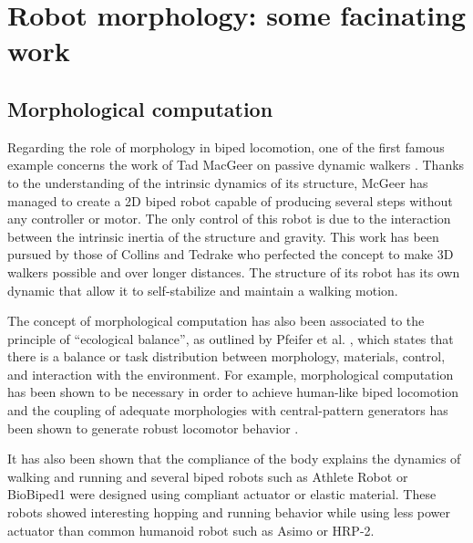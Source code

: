 

\chapter{Robot morphology: some facinating work} %

\section{Morphological computation} %

Regarding the role of morphology in biped locomotion, one of the first famous example concerns the work of Tad MacGeer on passive dynamic walkers \cite{mcgeer1990passive}. Thanks to the understanding of the intrinsic dynamics of its structure, McGeer has managed to create a 2D biped robot capable of producing several steps without any controller or motor. The only control of this robot is due to the interaction between the intrinsic inertia of the structure and gravity. This work has been pursued by those of Collins \cite{collins2001three} and Tedrake \cite{Tedrake2004}  who perfected the concept to make 3D walkers possible and over longer distances. The structure of its robot has its own dynamic that allow it to self-stabilize and maintain a walking motion.

The concept of morphological computation has also been associated to the principle of “ecological balance”, as outlined by Pfeifer et al. \cite{pfeifer2005new}, which states that there is a balance or task distribution between morphology, materials, control, and interaction with the environment. For example, morphological computation has been shown to be necessary in order to achieve human-like biped locomotion \cite{matsushita2005locomoting} and the coupling of adequate morphologies with central-pattern generators has been shown to generate robust locomotor behavior \cite{ijspeert2007swimming}\cite{steingrube2010self}.


It has also been shown that the compliance of the body explains the dynamics of walking and running \cite{Geyer2006} and several biped robots such as Athlete Robot \cite{niiyama2010athlete} or BioBiped1 \cite{radkhah2011concept} were designed using compliant actuator or elastic material. These robots showed interesting hopping and running behavior while using less power actuator than common humanoid robot such as Asimo or HRP-2.

